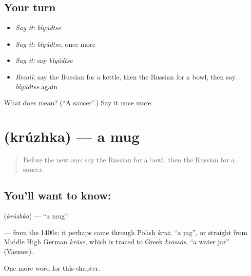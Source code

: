 \subsection*{Your turn}
\begin{itemize}
\raggedright
  \item \emph{Say it:} \emph{blyúdtse}
  \item \emph{Say it:} \emph{blyúdtse}, once more
  \item \emph{Say it:} say \emph{blyúdtse}
  \item \emph{Recall:} say the Russian for a kettle, then the Russian for a bowl, then say \emph{blyúdtse} again
\end{itemize}

\begin{tcolorbox}[breakable,colback=teal!4,colframe=teal!35!black,title={Before you move on}]
What does  mean? (\textquotedblleft{}A saucer\textquotedblright{}.) Say it once more.
\end{tcolorbox}
\section[\texorpdfstring{\ru{кружка} (krúzhka)}{кружка (krúzhka)}]{ (krúzhka) — a mug}

\label{lesson:RU-C246-kruzhka}



\begin{quote}
Before the new one: say the Russian for a bowl, then the Russian for a saucer.
\end{quote}

\subsection*{You'll want to know: }
\textbf{} (\emph{krúzhka}) — \textquotedblleft{}a mug\textquotedblright{}.

\begin{cousinweb}
\textbf{} — from the 1400s; it perhaps came through Polish \emph{kruż}, \textquotedblleft{}a jug\textquotedblright{}, or straight from Middle High German \emph{krûse}, which is traced to Greek \emph{krōssós}, \textquotedblleft{}a water jar\textquotedblright{} (Vasmer).
\end{cousinweb}

\begin{grammarlens}[title={What you've built}]
One more word for this chapter.
\end{grammarlens}

